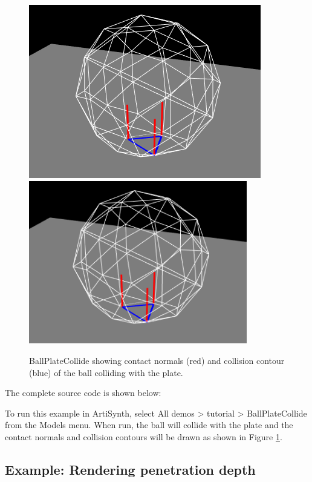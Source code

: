\begin{figure}[ht]
\begin{center}
\iflatexml
 \includegraphics[]{images/BallPlateCollide}
\else
 \includegraphics[width=3.75in]{images/BallPlateCollide}
\fi
\end{center}
\caption{BallPlateCollide showing contact normals (red) and collision contour
(blue) of the ball colliding with the plate.}
\label{BallPlateCollide:fig}
\end{figure}

The complete source code is shown below:
%
\lstset{numbers=left}

\lstset{numbers=none}

To run this example in ArtiSynth, select {\sf All demos > tutorial >
BallPlateCollide} from the {\sf Models} menu. When run, the ball
will collide with the plate and the contact normals and collision 
contours will be drawn as shown in Figure \ref{BallPlateCollide:fig}.

\subsection{Example: Rendering penetration depth}
\label{renderingDepth:sec}

